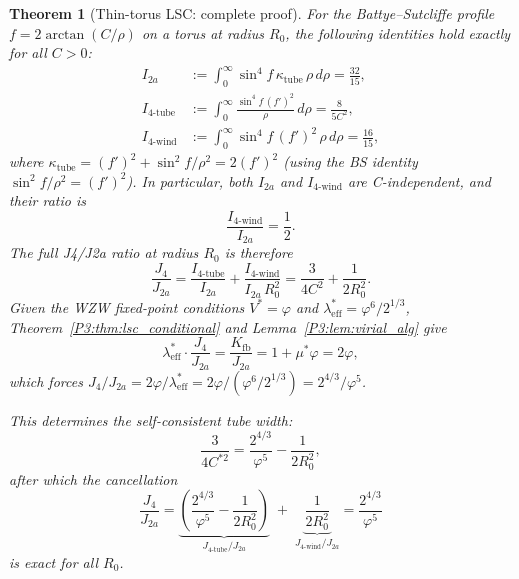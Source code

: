 \documentclass[11pt,a4paper]{article}
\newtheorem{theorem}{Theorem}[section]
\theoremstyle{definition}
\theoremstyle{remark}
\newcommand{\vp}{\varphi}
\newcommand{\leff}{\lambda_{\mathrm{eff}}}
\begin{document}
\begin{theorem}[Thin-torus LSC: complete proof]
\label{P3:thm:lsc_1d_complete}
For the Battye--Sutcliffe profile $f = 2\arctan(C/\rho)$ on a torus
at radius $R_0$, the following identities hold exactly for all $C>0$:
\begin{align}
  I_{2a} &:= \int_0^\infty \sin^4\!f\,\kappa_{\mathrm{tube}}\,\rho\,d\rho
           = \frac{32}{15}, \label{P3:eq:I2a_exact}\\
  I_{4\text{-tube}} &:= \int_0^\infty \frac{\sin^4\!f\,(f')^2}{\rho}\,d\rho
           = \frac{8}{5C^2}, \label{P3:eq:I4tube_exact}\\
  I_{4\text{-wind}} &:= \int_0^\infty \sin^4\!f\,(f')^2\,\rho\,d\rho
           = \frac{16}{15}, \label{P3:eq:I4wind_exact}
\end{align}
where $\kappa_{\mathrm{tube}} = (f')^2 + \sin^2\!f/\rho^2 = 2(f')^2$
(using the BS identity $\sin^2\!f/\rho^2 = (f')^2$).
In particular, both $I_{2a}$ and $I_{4\text{-wind}}$ are \emph{C-independent},
and their ratio is
\begin{equation}
  \frac{I_{4\text{-wind}}}{I_{2a}} = \frac{1}{2}.
  \label{P3:eq:wind_ratio}
\end{equation}
The full J4/J2a ratio at radius $R_0$ is therefore
\begin{equation}
  \frac{J_4}{J_{2a}} = \frac{I_{4\text{-tube}}}{I_{2a}} + \frac{I_{4\text{-wind}}}{I_{2a}\,R_0^2}
  = \frac{3}{4C^2} + \frac{1}{2R_0^2}.
  \label{P3:eq:J4J2a_full}
\end{equation}
Given the WZW fixed-point conditions $V^* = \vp$ and $\leff^* = \vp^6/2^{1/3}$,
Theorem~\ref{P3:thm:lsc_conditional} and Lemma~\ref{P3:lem:virial_alg} give
\begin{equation}
  \leff^* \cdot \frac{J_4}{J_{2a}} = \frac{K_{\mathrm{fb}}}{J_{2a}} = 1 + \mu^*\vp = 2\vp,
  \label{P3:eq:master_relation}
\end{equation}
which forces $J_4/J_{2a} = 2\vp/\leff^* = 2\vp/({\vp^6/2^{1/3}}) = 2^{4/3}/\vp^5$.

This determines the self-consistent tube width:
\begin{equation}
  \frac{3}{4C^{*2}} = \frac{2^{4/3}}{\vp^5} - \frac{1}{2R_0^2},
  \label{P3:eq:Cstar_R0}
\end{equation}
after which the cancellation
\begin{equation}
  \frac{J_4}{J_{2a}} = \underbrace{\left(\frac{2^{4/3}}{\vp^5}-\frac{1}{2R_0^2}\right)}_{J_{4\text{-tube}}/J_{2a}}
  \;+\; \underbrace{\frac{1}{2R_0^2}}_{J_{4\text{-wind}}/J_{2a}}
  = \frac{2^{4/3}}{\vp^5}
  \label{P3:eq:cancellation}
\end{equation}
is exact for all $R_0$.
\end{theorem}
\end{document}
